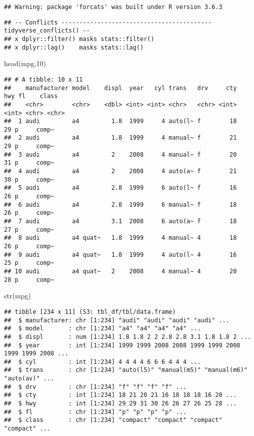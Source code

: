 \documentclass[
]{article}
\newenvironment{Shaded}{\begin{snugshade}}{\end{snugshade}}
\newcommand{\DecValTok}[1]{\textcolor[rgb]{0.00,0.00,0.81}{#1}}
\newcommand{\FunctionTok}[1]{\textcolor[rgb]{0.00,0.00,0.00}{#1}}
\newcommand{\NormalTok}[1]{#1}
\begin{document}
\begin{verbatim}
## Warning: package 'forcats' was built under R version 3.6.3
\end{verbatim}

\begin{verbatim}
## -- Conflicts ------------------------------------------ tidyverse_conflicts() --
## x dplyr::filter() masks stats::filter()
## x dplyr::lag()    masks stats::lag()
\end{verbatim}

\begin{Shaded}
\begin{Highlighting}[]
\FunctionTok{head}\NormalTok{(mpg,}\DecValTok{10}\NormalTok{)}
\end{Highlighting}
\end{Shaded}

\begin{verbatim}
## # A tibble: 10 x 11
##    manufacturer model    displ  year   cyl trans   drv     cty   hwy fl    class
##    <chr>        <chr>    <dbl> <int> <int> <chr>   <chr> <int> <int> <chr> <chr>
##  1 audi         a4         1.8  1999     4 auto(l~ f        18    29 p     comp~
##  2 audi         a4         1.8  1999     4 manual~ f        21    29 p     comp~
##  3 audi         a4         2    2008     4 manual~ f        20    31 p     comp~
##  4 audi         a4         2    2008     4 auto(a~ f        21    30 p     comp~
##  5 audi         a4         2.8  1999     6 auto(l~ f        16    26 p     comp~
##  6 audi         a4         2.8  1999     6 manual~ f        18    26 p     comp~
##  7 audi         a4         3.1  2008     6 auto(a~ f        18    27 p     comp~
##  8 audi         a4 quat~   1.8  1999     4 manual~ 4        18    26 p     comp~
##  9 audi         a4 quat~   1.8  1999     4 auto(l~ 4        16    25 p     comp~
## 10 audi         a4 quat~   2    2008     4 manual~ 4        20    28 p     comp~
\end{verbatim}

\begin{Shaded}
\begin{Highlighting}[]
\FunctionTok{str}\NormalTok{(mpg)}
\end{Highlighting}
\end{Shaded}

\begin{verbatim}
## tibble [234 x 11] (S3: tbl_df/tbl/data.frame)
##  $ manufacturer: chr [1:234] "audi" "audi" "audi" "audi" ...
##  $ model       : chr [1:234] "a4" "a4" "a4" "a4" ...
##  $ displ       : num [1:234] 1.8 1.8 2 2 2.8 2.8 3.1 1.8 1.8 2 ...
##  $ year        : int [1:234] 1999 1999 2008 2008 1999 1999 2008 1999 1999 2008 ...
##  $ cyl         : int [1:234] 4 4 4 4 6 6 6 4 4 4 ...
##  $ trans       : chr [1:234] "auto(l5)" "manual(m5)" "manual(m6)" "auto(av)" ...
##  $ drv         : chr [1:234] "f" "f" "f" "f" ...
##  $ cty         : int [1:234] 18 21 20 21 16 18 18 18 16 20 ...
##  $ hwy         : int [1:234] 29 29 31 30 26 26 27 26 25 28 ...
##  $ fl          : chr [1:234] "p" "p" "p" "p" ...
##  $ class       : chr [1:234] "compact" "compact" "compact" "compact" ...
\end{verbatim}
\end{document}
